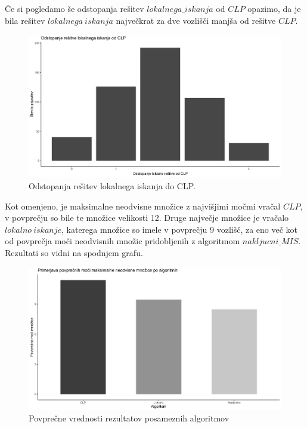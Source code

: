 \documentclass[a4paper, 12pt]{article}
\begin{document}
Če si pogledamo še odstopanja rešitev $lokalnega \_ iskanja$ od $CLP$ opazimo, da je bila rešitev $lokalnega\ iskanja$ največkrat za dve vozlišči manjša od rešitve $CLP$.

\begin{figure}[h!]
	\begin{center}
		\includegraphics[scale=0.10]{R_koda/pon-napake.png}
		\caption{Odstopanja rešitev lokalnega iskanja do CLP.}
	\end{center}
\end{figure}

Kot omenjeno, je maksimalne neodvisne množice z najvišjimi močmi vračal $CLP$, v povprečju so bile te množice velikosti 12. Druge največje množice je vračalo $lokalno\ iskanje$,
katerega množice so imele v povprečju 9 vozlišč, za eno več kot od povprečja moči neodvisnih množic pridobljenih z algoritmom $nakljucni\_MIS$. Rezultati so vidni na spodnjem grafu.

\begin{figure}[h!]
	\begin{center}
		\includegraphics[scale=0.10]{R_koda/pon-povpmoc.png}
		\caption{Povprečne vrednosti rezultatov posameznih algoritmov}
	\end{center}
\end{figure}
\end{document}
